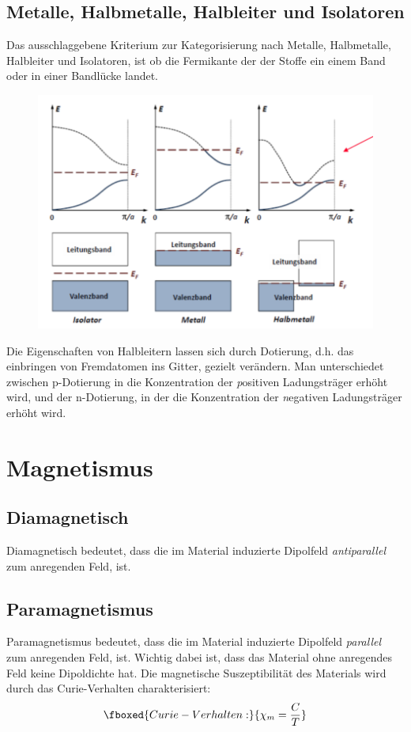 \documentclass[bfvec]{summery_5.0}
\begin{document}
\subsection{Metalle, Halbmetalle, Halbleiter und Isolatoren}
Das ausschlaggebene Kriterium zur Kategorisierung nach Metalle, Halbmetalle, Halbleiter und Isolatoren, ist ob die Fermikante der   der Stoffe ein einem Band oder in einer Bandlücke landet.
\begin{figure}[H]
    \centering
    \includegraphics[width=.6\textwidth]{stoffklassen.png}
\end{figure}
Die Eigenschaften von Halbleitern lassen sich durch Dotierung, d.h. das einbringen von Fremdatomen ins Gitter, gezielt verändern. Man unterschiedet zwischen p-Dotierung in die Konzentration der \emph{p}ositiven Ladungsträger erhöht wird, und der n-Dotierung, in der die Konzentration der \emph{n}egativen Ladungsträger erhöht wird. 


\section{Magnetismus}
\subsection{Diamagnetisch}
Diamagnetisch bedeutet, dass die im Material induzierte Dipolfeld \emph{antiparallel} zum anregenden Feld, ist.

\subsection{Paramagnetismus}
Paramagnetismus bedeutet, dass die im Material induzierte Dipolfeld \emph{parallel} zum anregenden Feld, ist. Wichtig dabei ist, dass das Material ohne anregendes Feld keine Dipoldichte hat.
Die magnetische Suszeptibilität des Materials wird durch das Curie-Verhalten charakterisiert:
\begin{align*}
    \fboxed{Curie-Verhalten:}{\chi_m = \frac C T}
\end{align*}
\end{document}
